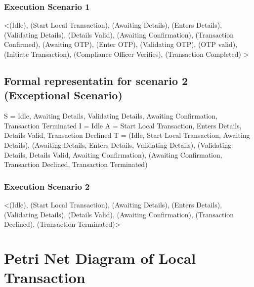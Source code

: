 \documentclass[a4paper]{report}
\begin{document}
\subsubsection{Execution Scenario 1}

<(Idle), (Start Local Transaction), (Awaiting Details), (Enters Details), (Validating Details), (Details Valid), (Awaiting Confirmation), (Transaction Confirmed), (Awaiting OTP), (Enter OTP), (Validating OTP), (OTP valid), (Initiate Transaction), (Compliance Officer Verifies), (Transaction Completed) >

\subsection{Formal representatin for scenario 2 (Exceptional Scenario)}

S = {Idle, Awaiting Details,  Validating Details, Awaiting Confirmation, Transaction Terminated}
\newline
I = {Idle}
\newline
A = {Start Local Transaction, Enters Details, Details Valid, Transaction Declined}
\newline
T = {(Idle, Start Local Transaction, Awaiting Details), (Awaiting Details, Enters Details, Validating Details), (Validating Details, Details Valid, Awaiting Confirmation), (Awaiting Confirmation, Transaction Declined, Transaction Terminated)}
\newline

\subsubsection{Execution Scenario 2}

<(Idle), (Start Local Transaction), (Awaiting Details), (Enters Details), (Validating Details), (Details Valid), (Awaiting Confirmation), (Transaction Declined),  (Transaction Terminated)>

\section{Petri Net Diagram of Local Transaction}
\end{document}

